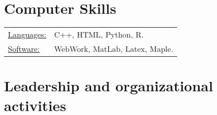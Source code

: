\documentclass[margin]{res}
\begin{document}
\begin{resume}
 
\section{Computer Skills}
 
   \begin{tabular}{l p{4in}}
    \underline{Languages:} & C++, HTML, Python, R.\\
     \underline{Software:} &  WebWork, MatLab, Latex, Maple.\\%
 \end{tabular}
 
  \section{Leadership and organizational activities}


\end{resume}
\end{document}
